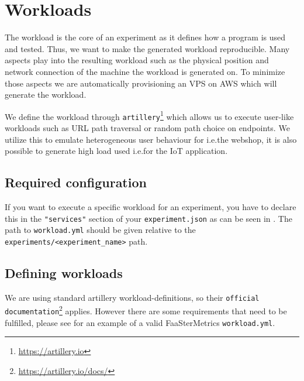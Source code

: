 \documentclass[../main.tex]{subfiles}
\begin{document}
\section{Workloads}\label{sec:WorkloadsStructure}


The workload is the core of an experiment as it defines how a program is used and tested. 
Thus, we want to make the generated workload reproducible. 
Many aspects play into the resulting workload such as the physical position and network connection of the machine the workload is generated on. 
To minimize those aspects we are automatically provisioning an VPS on AWS which will generate the workload.

We define the workload through \texttt{artillery}\footnote{\url{https://artillery.io}} which allows us to 
execute user-like workloads such as URL path traversal or random path choice on endpoints. 
We utilize this to emulate heterogeneous user behaviour for i.e.\@ the webshop, 
it is also possible to generate high load used i.e.\@ for the IoT application.

\subsection{Required configuration}


If you want to execute a specific workload for an experiment, 
you have to declare this in the \texttt{"services"} section of your \texttt{experiment.json} as can be seen in .
The path to \texttt{workload.yml} should be given relative to the \texttt{experiments/<experiment\_name>} path. 

\subsection{Defining workloads}

We are using standard artillery workload-definitions, 
so their \texttt{official documentation}\footnote{\url{https://artillery.io/docs/}} applies. 
However there are some requirements that need to be fulfilled, 
please see  for an example of a valid FaaSterMetrics \texttt{workload.yml}.
\end{document}
